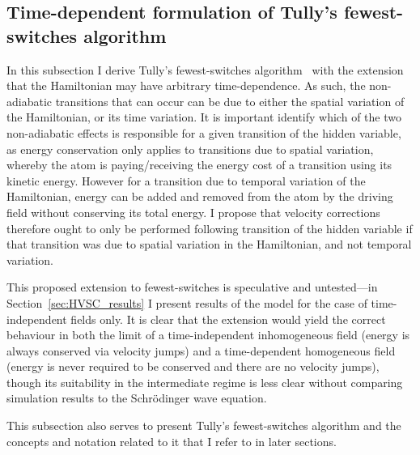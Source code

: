 \subsection{Time-dependent formulation of Tully's fewest-switches algorithm}\label{sec:fewest_switches}

In this subsection I derive Tully's fewest-switches algorithm~\cite{doi:10.1146/annurev-physchem-040215-112245, doi:10.1063/1.459170} with the extension that the Hamiltonian may have arbitrary time-dependence. As such, the non-adiabatic transitions that can occur can be due to either the spatial variation of the Hamiltonian, or its time variation. It is important identify which of the two non-adiabatic effects is responsible for a given transition of the hidden variable, as energy conservation only applies to transitions due to spatial variation, whereby the atom is paying/receiving the energy cost of a transition using its kinetic energy. However for a transition due to temporal variation of the Hamiltonian, energy can be added and removed from the atom by the driving field without conserving its total energy. I propose that velocity corrections therefore ought to only be performed following transition of the hidden variable if that transition was due to spatial variation in the Hamiltonian, and not temporal variation.

This proposed extension to fewest-switches is speculative and untested---in Section~\ref{sec:HVSC_results} I present results of the model for the case of time-independent fields only. It is clear that the extension would yield the correct behaviour in both the limit of a time-independent inhomogeneous field (energy is always conserved via velocity jumps) and a time-dependent homogeneous field (energy is never required to be conserved and there are no velocity jumps), though its suitability in the intermediate regime is less clear without comparing simulation results to the Schr\"odinger wave equation.

This subsection also serves to present Tully's fewest-switches algorithm and the concepts and notation related to it that I refer to in later sections.

